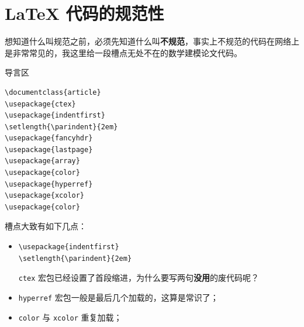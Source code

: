 \documentclass[aspectratio=169,fontset=none]{ctexbeamer}
\renewcommand{\emph}[1]{{\color{red}\bfseries #1}}
\newcommand{\pkg}[1]{\texttt{#1}}
\begin{document}
  \section{\texorpdfstring{\LaTeX{}}{LaTeX} 代码的规范性}
  \begin{frame}
    想知道什么叫规范之前，必须先知道什么叫\emph{不规范}，事实上不规范的代码在网络上是非常常见的，我这里给一段槽点无处不在的数学建模论文代码。
  \end{frame}

  \begin{frame}[fragile]{导言区}
    \begin{minipage}[t]{0.5\textwidth}
      \begin{verbatim}
\documentclass{article}
\usepackage{ctex}
\usepackage{indentfirst}
\setlength{\parindent}{2em}
\usepackage{fancyhdr}
\usepackage{lastpage}
\usepackage{array}
\usepackage{color}
\usepackage{hyperref}
\usepackage{xcolor}
\usepackage{color}
      \end{verbatim}
    \end{minipage}%
    \begin{minipage}[t]{0.5\textwidth}
      槽点大致有如下几点：
      \begin{itemize}
        \item \begin{verbatim}
\usepackage{indentfirst}
\setlength{\parindent}{2em}
        \end{verbatim}
        \pkg{ctex} 宏包已经设置了首段缩进，为什么要写两句\emph{没用}的废代码呢？
        \item \pkg{hyperref} 宏包一般是最后几个加载的，这算是常识了；
        \item \pkg{color} 与 \pkg{xcolor} 重复加载；
      \end{itemize}
    \end{minipage}
  \end{frame}
\end{document}
